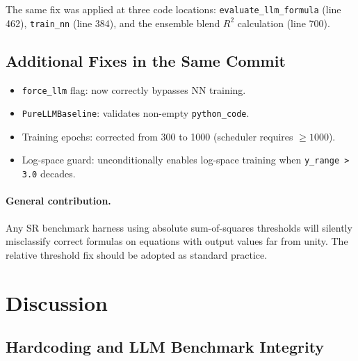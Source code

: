\documentclass[twoside,11pt]{article}
\newcommand{\Rsq}{R^{2}}
\begin{document}
The same fix was applied at three code locations:
\texttt{evaluate\_llm\_formula} (line 462),
\texttt{train\_nn} (line 384), and
the ensemble blend $\Rsq$ calculation (line 700).

\subsection{Additional Fixes in the Same Commit}

\begin{itemize}
  \item \texttt{force\_llm} flag: now correctly bypasses NN training.
  \item \texttt{PureLLMBaseline}: validates non-empty \texttt{python\_code}.
  \item Training epochs: corrected from 300 to 1000 (scheduler requires $\geq 1000$).
  \item Log-space guard: unconditionally enables log-space training when
    \texttt{y\_range > 3.0} decades.
\end{itemize}

\paragraph{General contribution.}
Any SR benchmark harness using absolute sum-of-squares thresholds will
silently misclassify correct formulas on equations with output values far
from unity.  The relative threshold fix should be adopted as standard practice.

\section{Discussion}
\label{suppb:discussion}

\subsection{Hardcoding and LLM Benchmark Integrity}
\end{document}
